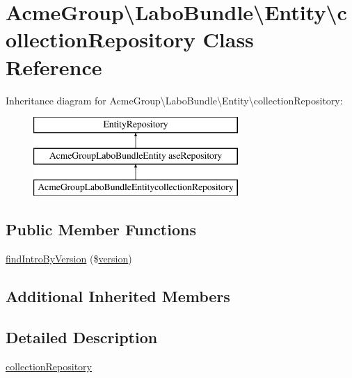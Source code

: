 \hypertarget{class_acme_group_1_1_labo_bundle_1_1_entity_1_1collection_repository}{\section{Acme\+Group\textbackslash{}Labo\+Bundle\textbackslash{}Entity\textbackslash{}collection\+Repository Class Reference}
\label{class_acme_group_1_1_labo_bundle_1_1_entity_1_1collection_repository}
}
Inheritance diagram for Acme\+Group\textbackslash{}Labo\+Bundle\textbackslash{}Entity\textbackslash{}collection\+Repository\+:\begin{figure}[H]
\begin{center}
\leavevmode
\includegraphics[height=3.000000cm]{class_acme_group_1_1_labo_bundle_1_1_entity_1_1collection_repository}
\end{center}
\end{figure}
\subsection*{Public Member Functions}
\begin{DoxyCompactItemize}
\item 
\hyperlink{class_acme_group_1_1_labo_bundle_1_1_entity_1_1collection_repository_a9cc30b08c755222fcff33045c1806ff2}{find\+Intro\+By\+Version} (\$\hyperlink{class_acme_group_1_1_labo_bundle_1_1_entity_1_1version}{version})
\end{DoxyCompactItemize}
\subsection*{Additional Inherited Members}


\subsection{Detailed Description}
\hyperlink{class_acme_group_1_1_labo_bundle_1_1_entity_1_1collection_repository}{collection\+Repository}

